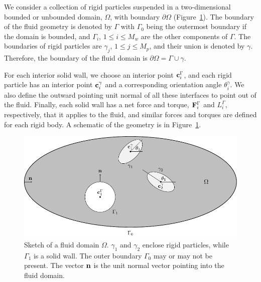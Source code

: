 \documentclass[preprint, 10pt]{elsarticle}
\begin{document}
We consider a collection of rigid particles suspended in a
two-dimensional bounded or unbounded domain, $\Omega$, with boundary
$\partial\Omega$ (Figure~\ref{fig:geomSchematic}).  The boundary of the
fluid geometry is denoted by $\Gamma$ with $\Gamma_0$ being the
outermost boundary if the domain is bounded, and $\Gamma_i$, $1\leq i
\leq M_w$ are the other components of $\Gamma$.  The boundaries of rigid
particles are $\gamma_j$, $1\leq j\leq M_p$, and their union is denoted by
$\gamma$.  Therefore, the boundary of the fluid domain is $ \partial\Omega =\Gamma \cup \gamma$.
 
For each interior solid wall, we choose an interior point
${\mathbf{c}}^\Gamma_i$, and each rigid particle has an interior point
${\mathbf{c}}^\gamma_i$ and a corresponding orientation angle $\theta^\gamma_i$.
We also define the outward pointing unit normal of all these interfaces
to point out of the fluid. Finally, each solid wall has a net force and
torque, ${\mathbf{F}}^\Gamma_i$ and $L^\Gamma_i$, respectively, that it applies
to the fluid, and similar forces and torques are defined for each rigid
body.  A schematic of the geometry is in Figure~\ref{fig:geomSchematic}.

\begin{figure}[!h]
\begin{center}
\includegraphics{figures/multiply_connected.pdf}
\end{center}
\caption{\label{fig:geomSchematic}Sketch of a fluid domain $\Omega$.
$\gamma_1$ and $\gamma_2$ enclose rigid particles, while $\Gamma_1$ is a solid
wall. The outer boundary $\Gamma_0$ may or may not be present.  The vector
${\mathbf{n}}$ is the unit normal vector pointing into the fluid domain.}
\end{figure}

\end{document}
